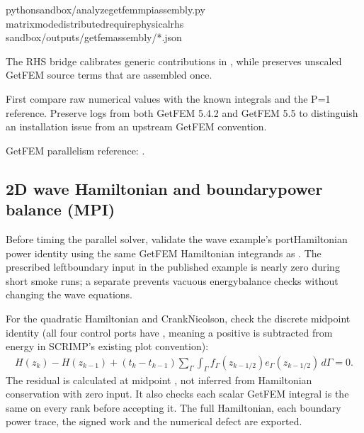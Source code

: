 \documentclass[letterpaper,10pt,english]{sphinxmanual}
\begin{document}
\begin{sphinxVerbatim}[commandchars=\\\{\}]
pythonsandbox/analyze\PYGZus{}getfem\PYGZus{}mpi\PYGZus{}assembly.py
\PYGZhy{}\PYGZhy{}matrix\PYGZhy{}modedistributed\PYGZhy{}\PYGZhy{}require\PYGZhy{}physical\PYGZhy{}rhs
sandbox/outputs/getfem\PYGZhy{}assembly/*.json
\end{sphinxVerbatim}

\sphinxAtStartPar
The RHS bridge calibrates generic contributions in
, while
preserves unscaled GetFEM source terms that are assembled once.

\sphinxAtStartPar
{} First compare raw numerical values with
the known integrals and the P=1 reference. Preserve logs from
both GetFEM 5.4.2 and GetFEM 5.5 to distinguish an installation
issue from an upstream GetFEM convention.

\sphinxAtStartPar
GetFEM parallelism reference:
.


\subsection{2D wave Hamiltonian and boundary\sphinxhyphen{}power balance (MPI)}
\label{\detokenize{install:d-wave-hamiltonian-and-boundary-power-balance-mpi}}
\sphinxAtStartPar
Before timing the parallel solver, validate the  wave
example’s port\sphinxhyphen{}Hamiltonian power identity using the same GetFEM
Hamiltonian integrands as . The prescribed
left\sphinxhyphen{}boundary input in the published example is nearly zero during
short smoke runs; a separate  prevents
vacuous energy\sphinxhyphen{}balance checks without changing the wave equations.

\sphinxAtStartPar
For the quadratic Hamiltonian and Crank\textendash{}Nicolson, check the discrete
midpoint identity (all four control ports have
, meaning a positive  is
subtracted from energy in SCRIMP’s existing plot convention):
\begin{equation*}
\begin{split}H(z_{k})-H(z_{k-1}) + (t_k-t_{k-1})
\sum_{\Gamma} \int_{\Gamma}
f_{\Gamma}(z_{k-1/2}) e_{\Gamma}(z_{k-1/2}) \,d\Gamma = 0.\end{split}
\end{equation*}
\sphinxAtStartPar
The residual is calculated  at midpoint , not inferred from Hamiltonian conservation with zero input.
It also checks each scalar GetFEM integral is the same on every
rank before accepting it. The full Hamiltonian, each boundary
power trace, the signed work and the numerical defect are exported.
\end{document}

